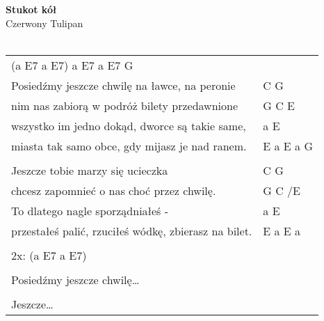 \documentclass[a5paper]{article}
\begin{document}


\noindent
\fontsize{12pt}{15pt}\selectfont
\textbf{Stukot kół} \\
\fontsize{8pt}{10pt}\selectfont
Czerwony Tulipan \\ \\
\fontsize{10pt}{12pt}\selectfont
{}
\begin{tabular}{@{}p{8.50cm}p{3cm}@{}}
\noindent
(a E7 a E7) a E7 a E7 G & \\
Posiedźmy jeszcze chwilę na ławce, na peronie & C G \\
nim nas zabiorą w podróż bilety przedawnione & G C E \\
wszystko im jedno dokąd, dworce są takie same, & a E \\
miasta tak samo obce, gdy mijasz je nad ranem. & E a E a G \\ \\

Jeszcze tobie marzy się ucieczka & C G \\
chcesz zapomnieć o nas choć przez chwilę. & G C /E \\
To dlatego nagle sporządniałeś - & a E \\
przestałeś palić, rzuciłeś wódkę, zbierasz na bilet. & E a E a \\ \\

2x: (a E7 a E7) & \\ \\

Posiedźmy jeszcze chwilę… & \\ \\

Jeszcze… &
\end{tabular}
\end{document}
